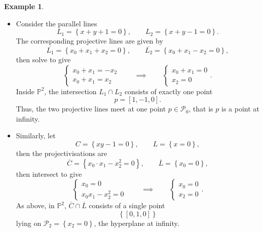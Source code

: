 \documentclass{article}
\renewcommand{\P}{\mathbb{P}}
\renewcommand{\sb}[1]{\left[ #1 \right]}
\newcommand{\cb}[1]{\left\{ #1 \right\}}
\theoremstyle{definition}\newtheorem{definition}{Definition}[section]
\theoremstyle{definition}\newtheorem{notation}[definition]{Notation}
\theoremstyle{definition}\newtheorem{remark}[definition]{Remark}
\theoremstyle{definition}\newtheorem{example1}[definition]{Example}
\theoremstyle{definition}\newtheorem{fact}{Fact}
\theoremstyle{definition}\newtheorem{exercise}{Exercise}
\theoremstyle{definition}\newtheorem*{example2}{Example}
\begin{document}
\begin{example1}
\hfill
\begin{itemize}
\item Consider the parallel lines
$$ L_1 = \cb{x + y + 1 = 0}, \qquad L_2 = \cb{x + y - 1 = 0}. $$
The corresponding projective lines are given by
$$ \overline{L_1} = \cb{x_0 + x_1 + x_2 = 0}, \qquad \overline{L_2} = \cb{x_0 + x_1 - x_2 = 0}, $$
then solve to give
$$ \begin{cases}
x_0 + x_1 = -x_2 \\
x_0 + x_1 = x_2
\end{cases} \qquad \implies \qquad \begin{cases}
x_0 + x_1 = 0 \\
x_2 = 0
\end{cases}. $$
Inside $ \P^2 $, the intersection $ L_1 \cap L_2 $ consists of exactly one point
$$ p = \sb{1, -1, 0}. $$
Thus, the two projective lines meet at one point $ p \in \mathcal{P}_0 $, that is $ p $ is a point at infinity.
\item Similarly, let
$$ C = \cb{xy - 1 = 0}, \qquad L = \cb{x = 0}, $$
then the projectivisations are
$$ \overline{C} = \cb{x_0 \cdot x_1 - x_2^2 = 0}, \qquad \overline{L} = \cb{x_0 = 0}, $$
then intersect to give
$$ \begin{cases}
x_0 = 0 \\
x_0x_1 - x_2^2 = 0
\end{cases} \qquad \implies \qquad \begin{cases}
x_0 = 0 \\
x_2 = 0
\end{cases}. $$
As above, in $ \P^2 $, $ \overline{C} \cap \overline{L} $ consists of a single point
$$ \cb{\sb{0, 1, 0}} $$
lying on $ \mathcal{P}_2 = \cb{x_2 = 0} $, the hyperplane at infinity.
\end{itemize}
\end{example1}
\end{document}
